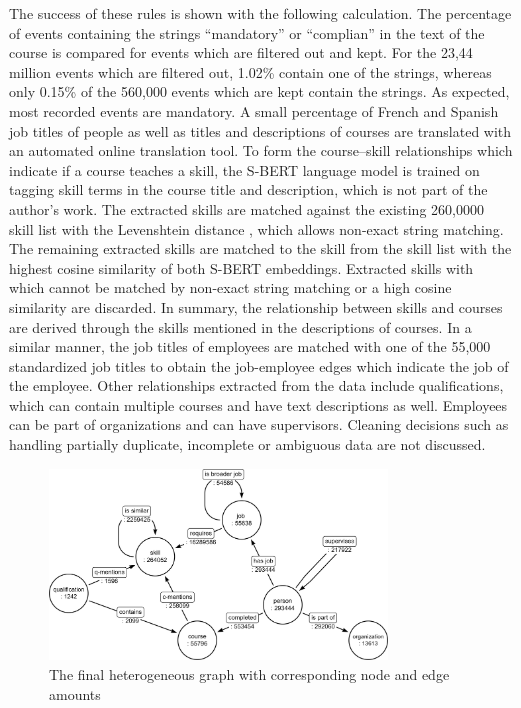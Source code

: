 The success of these rules is shown with the following calculation. The percentage of events containing the strings “mandatory” or “complian” in the text of the course is compared for events which are filtered out and kept. For the 23,44 million events which are filtered out, 1.02\% contain one of the strings, whereas only 0.15\% of the 560,000 events which are kept contain the strings. As expected, most recorded events are mandatory. A small percentage of French and Spanish job titles of people as well as titles and descriptions of courses are translated with an automated online translation tool. To form the course–skill relationships which indicate if a course teaches a skill, the S-BERT \parencite{Reimers2019SentenceBERTSE} language model is  trained on tagging skill terms in the course title and description, which is not part of the author's work. The extracted skills are matched against the existing 260,0000 skill list with the Levenshtein distance \parencite{levenshtein1966binary}, which allows non-exact string matching. The remaining extracted skills are matched to the skill from the skill list with the highest cosine similarity of both S-BERT \parencite{Reimers2019SentenceBERTSE} embeddings. Extracted skills with which cannot be matched by non-exact string matching or a high cosine similarity are discarded.  In summary, the relationship between skills and courses are derived through the skills mentioned in the descriptions of courses. In a similar manner, the job titles of employees are matched with one of the 55,000 standardized job titles to obtain the job-employee edges which indicate the job of the employee.
Other relationships extracted from the data include
qualifications, which can contain multiple courses and have text
descriptions as well. Employees can be part of organizations and can have supervisors. Cleaning decisions such as handling partially duplicate, incomplete or ambiguous data are not discussed.


\begin{figure}
    \centering
    \includegraphics[width=0.8\textwidth]{img/heterogeneousgraph (6).png}
    \caption[The heterogeneous Graph]{The final heterogeneous graph with corresponding node and edge amounts}
    \label{fig:graph}
\end{figure}

